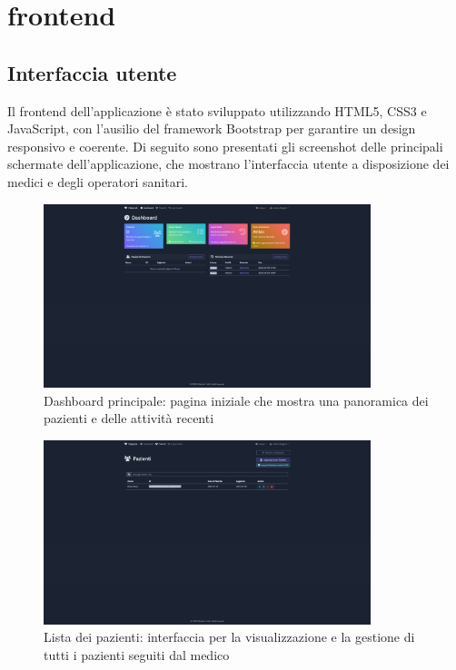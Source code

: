 \documentclass[12pt,a4paper,oneside]{report}
\begin{document}
\section{frontend}
\subsection{Interfaccia utente}
Il frontend dell'applicazione è stato sviluppato utilizzando HTML5, CSS3 e JavaScript, con l'ausilio del framework Bootstrap per garantire un design responsivo e coerente. Di seguito sono presentati gli screenshot delle principali schermate dell'applicazione, che mostrano l'interfaccia utente a disposizione dei medici e degli operatori sanitari.

\begin{figure}[H]
    \centering
    \includegraphics[width=0.85\textwidth]{images/screen/dash.png}
    \caption{Dashboard principale: pagina iniziale che mostra una panoramica dei pazienti e delle attività recenti}
    \label{fig:dashboard}
\end{figure}

\begin{figure}[H]
    \centering
    \includegraphics[width=0.85\textwidth]{images/screen/list.png}
    \caption{Lista dei pazienti: interfaccia per la visualizzazione e la gestione di tutti i pazienti seguiti dal medico}
    \label{fig:patient-list}
\end{figure}
\end{document}

